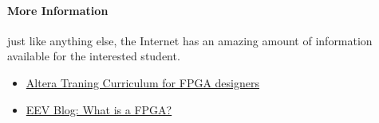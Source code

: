 \documentclass[12pt,journal]{IEEEtran}
\begin{document}
    \paragraph{More Information} just like anything else, the Internet has an amazing amount of information available
    for the interested student. 
      \begin{itemize}
        \item \href{http://www.altera.com/education/training/curriculum/fpga/trn-fpga.html}{Altera Traning Curriculum for FPGA designers}
        \item \href{www.eevblog.com}{EEV Blog: What is a FPGA?}
      \end{itemize}

  
  
\end{document}
